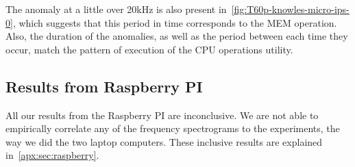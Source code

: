 The anomaly at a little over 20kHz is also present in~\autoref{fig:T60p-knowles-micro-ips-0}, which suggests that this period in time corresponds to the MEM operation.
Also, the duration of the anomalies, as well as the period between each time they occur, match the pattern of execution of the CPU operations utility.


\subsection{Results from Raspberry PI}\label{chp5:subsec:rb_bk_results}
All our results from the Raspberry PI are inconclusive.
We are not able to empirically correlate any of the frequency spectrograms to the experiments, the way we did the two laptop computers.
These inclusive results are explained in~\autoref{apx:sec:raspberry}.
